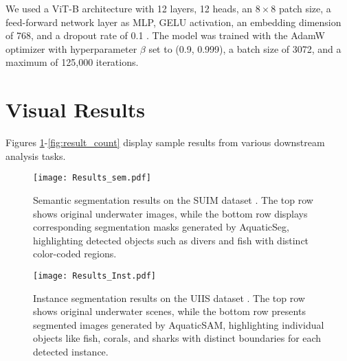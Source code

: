 We used a ViT-B architecture with 12 layers, 12 heads, an $8 \times 8$ patch size, a feed-forward network layer as MLP, GELU activation, an embedding dimension of 768, and a dropout rate of 0.1 \cite{dosovitskiy2020image}.
The model was trained with the AdamW optimizer with hyperparameter $\beta$ set to (0.9, 0.999), a batch size of 3072, and a maximum of 125,000 iterations.











\section{Visual Results}
\label{visual}
Figures \ref{fig:result_sem}-\ref{fig:result_count} display sample results from various downstream analysis tasks.

\begin{figure}[t!]
\centering
\texttt{[image: Results\_sem.pdf]}
\caption{ Semantic segmentation results on the SUIM dataset \cite{islam2020suim}.
 The top row shows original underwater images, while the bottom row displays corresponding segmentation masks generated by AquaticSeg, highlighting detected objects such as divers and fish with distinct color-coded regions.}
\label{fig:result_sem}
\end{figure}




\begin{figure}[t!]
\centering
\texttt{[image: Results\_Inst.pdf]}
\caption{Instance segmentation results on the UIIS dataset \cite{Lian_2023_ICCV}.
The top row shows original underwater scenes, while the bottom row presents segmented images generated by AquaticSAM, highlighting individual objects like fish, corals, and sharks with distinct boundaries for each detected instance.}
\label{fig:result_inst}
\end{figure}





